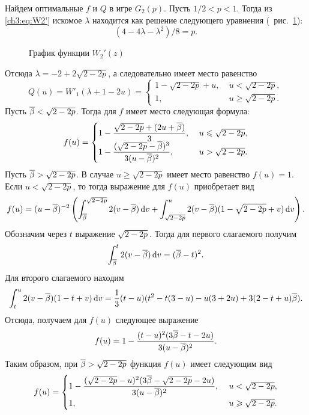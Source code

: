{\begin{example}
  Найдем оптимальные $f$ и $Q$ в игре $G_2(p)$.
  Пусть $1/2 < p < 1$.
  Тогда из \eqref{ch3:eq:W2'} искомое $\lambda$ находится как решение следующего уравнения (\seename~рис.~\ref{ch3:fig:W2}):
  \[
  (4 - 4\lambda - \lambda^2)/8 = p.
  \]
  \begin{figure}[hbt]
    \centering 
    \caption{График функции $W_2'(z)$}
    \label{ch3:fig:W2}
  \end{figure}
  Отсюда $\lambda = -2 + 2\sqrt{2 - 2p}$, а следовательно имеет место равенство
  \begin{equation*}
    Q(u) =
    W'_1(\lambda + 1 - 2u) =
    \begin{cases}
      1 - \sqrt{2 - 2p} + u, &\; u < \sqrt{2 - 2p},\\
      1, &\; u \geqslant \sqrt{2 - 2p}.
    \end{cases}
  \end{equation*}
  Пусть ${{\overline{\beta}}} < \sqrt{2 - 2p}$. Тогда для $f$ имеет место следующая формула:
  \begin{equation*}
    f(u) = \begin{cases}
      {\displaystyle 1 - \frac{\sqrt{2 - 2p} + (2u + \ensuremath{{{\overline{\beta}}}})}{3}}, &\; u \leqslant \sqrt{2 - 2p},\\
      {\displaystyle 1 - \frac{(\sqrt{2 - 2p} - {{\overline{\beta}}})^3}{3(u - {{\overline{\beta}}})^2}}, &\; u > \sqrt{2 - 2p}.
    \end{cases}
  \end{equation*}
  Пусть ${{\overline{\beta}}} > \sqrt{2-2p}$.
  В случае $u \geq \sqrt{2 - 2p}$ имеет место равенство $f(u) = 1$.
  Если $u < \sqrt{2 - 2p}$, то тогда выражение для $f(u)$ приобретает вид
  \begin{equation*}
    f(u) = (u-{{\overline{\beta}}})^{-2} \left( 
      \int_{{{\overline{\beta}}}}^{\sqrt{2-2p}} 2(v-{{\overline{\beta}}}) \mathop{}\!\mathrm{d} v +
      \int_{\sqrt{2-2p}}^u 2(v-{{\overline{\beta}}}) (1-\sqrt{2 - 2p} + v) \mathop{}\!\mathrm{d} v
    \right).
  \end{equation*}
  Обозначим через $t$ выражение $\sqrt{2-2p}$.
  Тогда для первого слагаемого получим
  \begin{equation*}
      \int_{{{\overline{\beta}}}}^t 2(v-{{\overline{\beta}}}) \mathop{}\!\mathrm{d} v = ({{\overline{\beta}}} - t)^2.
  \end{equation*}
  Для второго слагаемого находим
  \begin{equation*}
    \int_t^u 2(v - {{\overline{\beta}}}) (1 - t + v) \mathop{}\!\mathrm{d} v = \frac{1}{3} (t - u)(t^2 - t(3-u) - u(3 + 2u) + 3(2-t+u){{\overline{\beta}}}).
  \end{equation*}
  Отсюда, получаем для $f(u)$ следующее выражение
  \begin{equation*}
    f(u) = 1 - \frac{(t-u)^2(3{{\overline{\beta}}} - t - 2u)}{3(u-{{\overline{\beta}}})^2}.
  \end{equation*}
  Таким образом, при ${{\overline{\beta}}} > \sqrt{2-2p}$ функция $f(u)$ имеет следующим вид
  \begin{equation*}
    f(u) = \begin{cases}
      {\displaystyle 1 - \frac{(\sqrt{2-2p}-u)^2(3\ensuremath{{{\overline{\beta}}}}- \sqrt{2-2p} - 2u)}{3(u-\ensuremath{{{\overline{\beta}}}})^2}},\ & u < \sqrt{2-2p}, \\
      1,\ & u \geqslant \sqrt{2-2p}.
    \end{cases}
  \end{equation*}
  

\end{example}}
